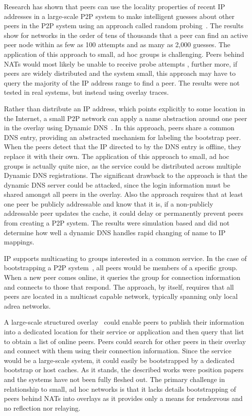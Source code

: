 \documentclass[conference]{IEEEtran}
\begin{document}
Research has shown that peers can use the locality properties of recent IP
addresses in a large-scale P2P system to make intelligent guesses about other
peers in the P2P system using an approach called random
probing~\cite{bootstrapping_p2p, locality_aware}.  The results show for
networks in the order of tens of thousands that a peer can find an active peer
node within as few as 100 attempts and as many as 2,000 guesses.  The
application of this approach to small, ad hoc groups is challenging.  Peers
behind NATs would most likely be unable to receive probe attempts , further
more, if peers are widely distributed and the system small, this approach may
have to query the majority of the IP address range to find a peer.  The results
were not tested in real systems, but instead using overlay traces.

Rather than distribute an IP address, which points explicitly to some location
in the Internet, a small P2P network can apply a name abstraction around one
peer in the overlay using Dynamic DNS~\cite{bootstrapping_ddns}.  In this
approach, peers share a common DNS entry, providing an abstracted mechanism for
labeling the bootstrap peer.  When the peers detect that the IP directed to by
the DNS entry is offline, they replace it with their own.  The application of
this approach to small, ad hoc groups is actually quite nice, as the service
could be distributed across multiple Dynamic DNS registrations.  The
significant drawback to the approach is that the dynamic DNS server could be
attacked, since the login information must be shared amongst all peers in the
overlay.  Also the approach requires that at least one peer be publicly
addressable and know that it is, if a non-publicly addressable peer updates the
cache, it could delay or permanently prevent peers from creating a P2P system.
The results were simulation based and did not determine how well a dynamic DNS
handles rapid changing of name to IP mappings.

IP supports multicasting to groups interested in a common service.  In the case
of bootstrapping a P2P system~\cite{pastry, locality_aware}, all peers would be
members of a specific group.  When a new peer comes online, it queries the
group for connection information and connects to those that respond.  The
approach, by itself, requires that all peers are located in a multicast capable
network, typically spanning only local adrea networks.

A large-scale structured overlay~\cite{one_ring, p2p_bootstrap} could enable
peers to publish their information into a dedicated location for their service
or application and then query that list to obtain a list of online peers.
Peers could search for other peers in their overlay and connect with them using
their connection information.  Since the service would be a large-scale system,
it could easily be bootstrapped by a dedicated bootstrap or host caches.  As it
stands, the described works were position papers and the systems have not been
fully fleshed out.  The primary challenge in relationship to small, ad hoc
networks is that it lacks details bootstrapping of peers behind NATs into
overlays as it provides only a means for rendezvous and no reflection nor
relaying.
\end{document}
